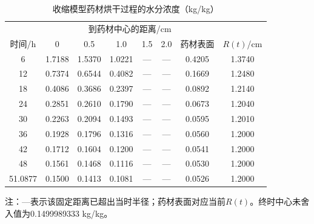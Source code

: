 \begin{table}[H]\centering\small
\caption{收缩模型药材烘干过程的水分浓度（kg/kg）}\label{tab_q4C}
\renewcommand{\arraystretch}{1.12}
\begin{tabular}{cccccccc}\toprule
 & \multicolumn{6}{c}{到药材中心的距离/cm} & \\
时间/h & 0 & 0.5 & 1.0 & 1.5 & 2.0 & 药材表面 & $R(t)$/cm\\\midrule
6 & 1.7188 & 1.5370 & 1.0221 & --- & --- & 0.4205 & 1.3740\\
12 & 0.7374 & 0.6544 & 0.4082 & --- & --- & 0.1669 & 1.2480\\
18 & 0.4086 & 0.3686 & 0.2397 & --- & --- & 0.0892 & 1.2140\\
24 & 0.2851 & 0.2610 & 0.1790 & --- & --- & 0.0673 & 1.2040\\
30 & 0.2263 & 0.2094 & 0.1493 & --- & --- & 0.0595 & 1.2010\\
36 & 0.1928 & 0.1796 & 0.1316 & --- & --- & 0.0560 & 1.2000\\
42 & 0.1712 & 0.1604 & 0.1200 & --- & --- & 0.0541 & 1.2000\\
48 & 0.1561 & 0.1468 & 0.1116 & --- & --- & 0.0530 & 1.2000\\
51.0877 & 0.1500 & 0.1413 & 0.1081 & --- & --- & 0.0526 & 1.2000\\
\bottomrule\end{tabular}
\par\vspace{3pt}\begin{minipage}{.96\linewidth}\footnotesize 注：---表示该固定距离已超出当时半径；药材表面对应当前$R(t)$。终时中心未舍入值为0.1499989333 kg/kg。\end{minipage}
\end{table}
